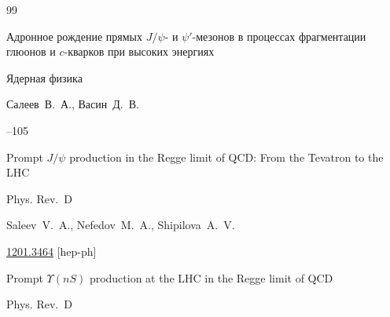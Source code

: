 \begin{thebibliography}{99}

 



\paper Адронное рождение прямых $J/\psi$- и $\psi'$-мезонов в процессах фрагментации глюонов и $c$-кварков при высоких энергиях

\jour Ядерная физика

\by Салеев~В.~А., Васин~Д.~В.




--105











% 




\paper Prompt $J / \psi$ production in the Regge limit of QCD: From the Tevatron to the LHC


\jour Phys. Rev.~D 



\by Saleev~V.~A., Nefedov~M.~A., Shipilova~A.~V.



\arxiv \href{http://arxiv.org/abs/1201.3464}{1201.3464} [hep-ph]




\paper Prompt $\Upsilon  ( n S )$ production at the LHC in the Regge limit of QCD


\jour Phys. Rev.~D 


\end{thebibliography}
